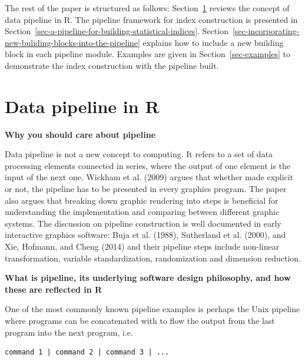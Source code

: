 \documentclass[
]{article}
\begin{document}
The rest of the paper is structured as follows:
Section~\ref{sec-data-pipeline-in-r} reviews the concept of data
pipeline in R. The pipeline framework for index construction is
presented in
Section~\ref{sec-a-pipeline-for-building-statistical-indices}.
Section~\ref{sec-incorporating-new-buliding-blocks-into-the-pipeline}
explains how to include a new building block in each pipeline module.
Examples are given in Section~\ref{sec-examples} to demonstrate the
index construction with the pipeline built.

\newpage

\hypertarget{sec-data-pipeline-in-r}{%
\section{Data pipeline in R}\label{sec-data-pipeline-in-r}}

\textbf{Why you should care about pipeline}

Data pipeline is not a new concept to computing. It refers to a set of
data processing elements connected in series, where the output of one
element is the input of the next one. Wickham et al. (2009) argues that
whether made explicit or not, the pipeline has to be presented in every
graphics program. The paper also argues that breaking down graphic
rendering into steps is beneficial for understanding the implementation
and comparing between different graphic systems. The discussion on
pipeline construction is well documented in early interactive graphics
software: Buja et al. (1988), Sutherland et al. (2000), and Xie,
Hofmann, and Cheng (2014) and their pipeline steps include non-linear
transformation, variable standardization, randomization and dimension
reduction.

\textbf{What is pipeline, its underlying software design philosophy, and
how these are reflected in R}

One of the most commonly known pipeline examples is perhaps the Unix
pipeline where programs can be concatenated with \texttt{\textbar{}} to
flow the output from the last program into the next program, i.e.~

\begin{verbatim}
command 1 | command 2 | command 3 | ...
\end{verbatim}
\end{document}
